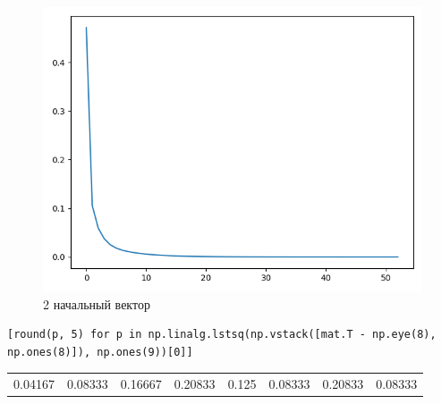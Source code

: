 \documentclass[11pt]{article}
\begin{document}
\begin{figure}[htbp]
\centering
\includegraphics[width=.9\linewidth]{./ds1.png}
\caption{2 начальный вектор}
\end{figure}

\begin{verbatim}
[round(p, 5) for p in np.linalg.lstsq(np.vstack([mat.T - np.eye(8), np.ones(8)]), np.ones(9))[0]]
\end{verbatim}

\begin{center}
\begin{tabular}{rrrrrrrr}
0.04167 & 0.08333 & 0.16667 & 0.20833 & 0.125 & 0.08333 & 0.20833 & 0.08333\\[0pt]
\end{tabular}
\end{center}
\end{document}
